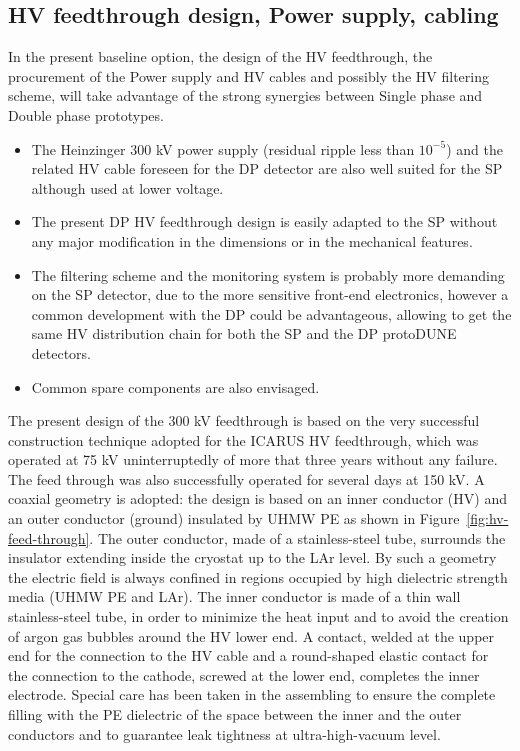 
\subsection{HV feedthrough design, Power supply, cabling}
In the present baseline option, the design of the HV feedthrough, the procurement of the Power supply and HV cables and possibly the HV filtering scheme, will take advantage of the strong synergies between Single phase and Double phase prototypes.

\begin{itemize}	
\item The Heinzinger 300 kV power supply (residual ripple less than $10^{-5}$) and the related HV cable foreseen for the DP detector are also well suited for the SP although used at lower voltage.
\item The present DP HV feedthrough design is easily adapted to the SP without any major modification in the dimensions or in the mechanical features.
\item The filtering scheme and the monitoring system is probably more demanding on the SP detector, due to the more sensitive front-end electronics, however a common development with the DP could be advantageous, allowing to get the same HV distribution chain for both the SP and the DP protoDUNE detectors.
\item Common spare components are also envisaged.
\end{itemize}

The present design of the 300 kV feedthrough is based on the very successful construction technique adopted for the ICARUS HV feedthrough, which was operated at 75 kV uninterruptedly of more that three years without any failure. The feed through was also successfully operated for several days at 150 kV.  
A coaxial geometry is adopted: the design is based on an inner conductor (HV) and an outer conductor (ground) insulated by UHMW PE  as shown in Figure~\ref{fig:hv-feed-through}. The outer conductor, made of a stainless-steel tube, surrounds the insulator extending inside the cryostat up to the LAr level. By such a geometry the electric field is always confined in regions occupied by high dielectric strength media (UHMW PE and LAr). The inner conductor is made of a thin wall stainless-steel tube, in order to minimize the heat input and to avoid the creation of argon gas bubbles around the HV lower end. A contact, welded at the upper end for the
connection to the HV cable and a round-shaped elastic contact for the connection to the cathode, screwed at the lower end, completes the inner electrode. Special care has been taken in the assembling to ensure the complete filling with the PE dielectric of the space between the inner and the outer conductors and to guarantee leak tightness at ultra-high-vacuum level.

